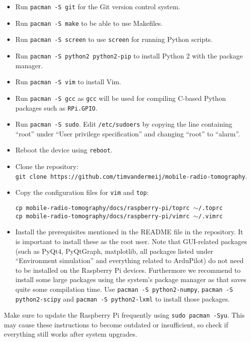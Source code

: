 \documentclass{article}
\begin{document}
\begin{itemize}
    \item Run {\tt pacman -S git} for the Git version control system.
    \item Run {\tt pacman -S make} to be able to use Makefiles.
    \item Run {\tt pacman -S screen} to use {\tt screen} for running Python
          scripts.
    \item Run {\tt pacman -S python2 python2-pip} to install Python 2 with the 
          package manager.
    \item Run {\tt pacman -S vim} to install Vim.
    \item Run {\tt pacman -S gcc} as {\tt gcc} will be used for compiling 
          C-based Python packages such as {\tt RPi.GPIO}.
    \item Run {\tt pacman -S sudo}. Edit {\tt /etc/sudoers} by copying the line 
          containing ``root'' under ``User privilege specification'' and 
          changing ``root'' to ``alarm''.
    \item Reboot the device using {\tt reboot}.
    \item Clone the repository: \\ {\tt git clone 
          https://github.com/timvandermeij/mobile-radio-tomography}.
    \item Copy the configuration files for {\tt vim} and {\tt top}:
        
          {\tt cp mobile-radio-tomography/docs/raspberry-pi/toprc 
          $\sim$/.toprc} \\
          {\tt cp mobile-radio-tomography/docs/raspberry-pi/vimrc 
          $\sim$/.vimrc}
    \item Install the prerequisites mentioned in the README file in the 
          repository. It is important to install these as the root user. Note 
          that GUI-related packages (such as PyQt4, PyQtGraph, matplotlib, all 
          packages listed under ``Environment simulation'' and everything 
          related to ArduPilot) do not need to be installed on the Raspberry Pi 
          devices. Furthermore we recommend to install some large packages 
          using the system's package manager as that saves quite some 
          compilation time. Use {\tt pacman -S python2-numpy}, {\tt pacman -S 
          python2-scipy} and {\tt pacman -S python2-lxml} to install those 
          packages.
\end{itemize}

Make sure to update the Raspberry Pi frequently using {\tt sudo pacman -Syu}. 
This may cause these instructions to become outdated or insufficient, so check 
if everything still works after system upgrades.
\end{document}
